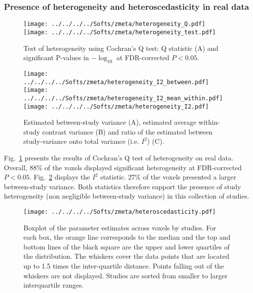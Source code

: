 \documentclass[preprint]{elsarticle}
\begin{document}
\subsubsection{Presence of heterogeneity and heteroscedasticity in real data}

\begin{figure}[h]
	\centering
 	\texttt{[image: ../../../../Softs/zmeta/heterogeneity\_Q.pdf]}
 	\texttt{[image: ../../../../Softs/zmeta/heterogeneity\_test.pdf]}
	\caption{Test of heterogeneity using Cochran's Q test: Q statistic (A) and significant P-values in $-\log_{10}$ at FDR-corrected $P<0.05$.}
	\label{fig:heterogeneity_Q}
\end{figure}

\begin{figure}[h]
	\centering
 	\texttt{[image: ../../../../Softs/zmeta/heterogeneity\_I2\_between.pdf]}
 	\texttt{[image: ../../../../Softs/zmeta/heterogeneity\_I2\_mean\_within.pdf]}
 	\texttt{[image: ../../../../Softs/zmeta/heterogeneity\_I2.pdf]}
	\caption{Estimated between-study variance (A), estimated average within-study contrast variance (B) and ratio of the estimated between study-variance onto total variance (i.e. $I^2$) (C).}
	\label{fig:heterogeneity_I2}
\end{figure}

Fig.~\ref{fig:heterogeneity_Q} presents the results of Cochran's Q test of heterogeneity on real data. Overall, 88\% of the voxels displayed significant heterogeneity at FDR-corrected $P < 0.05$. 
Fig.~\ref{fig:heterogeneity_I2} displays the $I^2$ statistic. 27\% of the voxels presented a larger between-study variance. Both statistics therefore support the presence of study heterogeneity (non negligible between-study variance) in this collection of studies.

\begin{figure}[h]
	\centering
 	\texttt{[image: ../../../../Softs/zmeta/heteroscedasticity.pdf]}
	\caption{Boxplot of the parameter estimates across voxels by studies. For each box, the orange line corresponds to the median
and the top and bottom lines of the black square are the upper and lower quartiles of the distribution. The whiskers cover the data
points that are located up to 1.5 times the inter-quartile distance. Points falling out of the whiskers are not displayed. Studies are sorted from smaller to larger interquartile ranges.}
	\label{fig:heteroscedasticity}
\end{figure}
\end{document}
